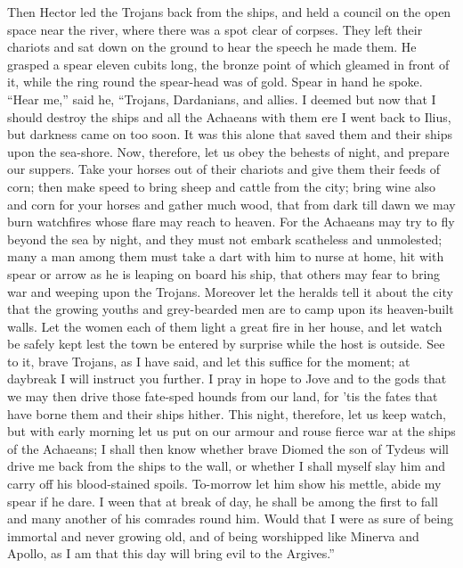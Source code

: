 Then Hector led the Trojans back from the ships, and held a council on the
open space near the river, where there was a spot clear of corpses. They
left their chariots and sat down on the ground to hear the speech he made
them. He grasped a spear eleven cubits long, the bronze point of which
gleamed in front of it, while the ring round the spear-head was of gold.
Spear in hand he spoke. “Hear me,” said he, “Trojans, Dardanians, and
allies. I deemed but now that I should destroy the ships and all the
Achaeans with them ere I went back to Ilius, but darkness came on too
soon. It was this alone that saved them and their ships upon the sea-shore.
Now, therefore, let us obey the behests of night, and prepare our suppers.
Take your horses out of their chariots and give them their feeds of corn;
then make speed to bring sheep and cattle from the city; bring wine also
and corn for your horses and gather much wood, that from dark till dawn we
may burn watchfires whose flare may reach to heaven. For the Achaeans may
try to fly beyond the sea by night, and they must not embark scatheless
and unmolested; many a man among them must take a dart with him to nurse
at home, hit with spear or arrow as he is leaping on board his ship, that
others may fear to bring war and weeping upon the Trojans. Moreover let
the heralds tell it about the city that the growing youths and
grey-bearded men are to camp upon its heaven-built walls. Let the women
each of them light a great fire in her house, and let watch be safely kept
lest the town be entered by surprise while the host is outside. See to it,
brave Trojans, as I have said, and let this suffice for the moment; at
daybreak I will instruct you further. I pray in hope to Jove and to the
gods that we may then drive those fate-sped hounds from our land, for ’tis
the fates that have borne them and their ships hither. This night,
therefore, let us keep watch, but with early morning let us put on our
armour and rouse fierce war at the ships of the Achaeans; I shall then
know whether brave Diomed the son of Tydeus will drive me back from the
ships to the wall, or whether I shall myself slay him and carry off his
blood-stained spoils. To-morrow let him show his mettle, abide my spear if
he dare. I ween that at break of day, he shall be among the first to fall
and many another of his comrades round him. Would that I were as sure of
being immortal and never growing old, and of being worshipped like Minerva
and Apollo, as I am that this day will bring evil to the Argives.”

